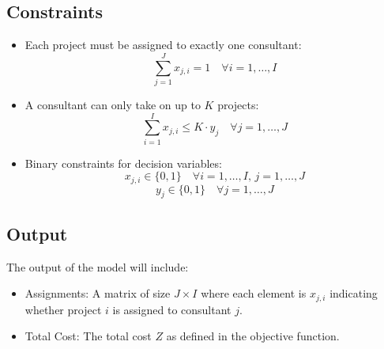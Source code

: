 \documentclass{article}
\begin{document}
\subsection*{Constraints}
\begin{itemize}
    \item Each project must be assigned to exactly one consultant:
    \[
    \sum_{j=1}^{J} x_{j,i} = 1 \quad \forall i = 1, \ldots, I
    \]
    
    \item A consultant can only take on up to $K$ projects:
    \[
    \sum_{i=1}^{I} x_{j,i} \leq K \cdot y_j \quad \forall j = 1, \ldots, J
    \]
    
    \item Binary constraints for decision variables:
    \[
    x_{j,i} \in \{0, 1\} \quad \forall i = 1, \ldots, I, \, j = 1, \ldots, J
    \]
    \[
    y_j \in \{0, 1\} \quad \forall j = 1, \ldots, J
    \]
\end{itemize}

\subsection*{Output}
The output of the model will include:
\begin{itemize}
    \item Assignments: A matrix of size $J \times I$ where each element is $x_{j,i}$ indicating whether project $i$ is assigned to consultant $j$.
    \item Total Cost: The total cost $Z$ as defined in the objective function.
\end{itemize}
\end{document}
